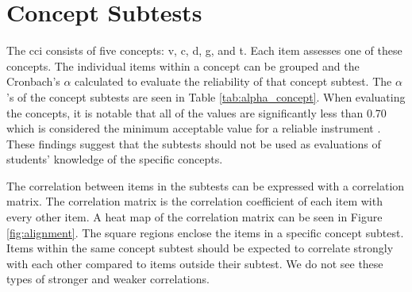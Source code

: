 \FloatBarrier
\section{Concept Subtests}
The \gls{cci} consists of five concepts: \gls{v}, \gls{c}, \gls{d}, \gls{g}, and \gls{t}. Each item assesses one of these concepts. The individual items within a concept can be grouped and the Cronbach's $\alpha$ calculated to evaluate the reliability of that concept subtest. The $\alpha$'s of the concept subtests are seen in Table \ref{tab:alpha_concept}. When evaluating the concepts, it is notable that all of the values are significantly less than 0.70 which is considered the minimum acceptable value for a reliable instrument \cite{panayiotis}. These findings suggest that the subtests should not be used as evaluations of students' knowledge of the specific concepts. 


\begin{table}[!htbp]
\caption{Cronbach's $\alpha$ by Concept}
\centering
{}
\label{tab:alpha_concept}
\end{table}


\iflong

The correlation between items in the subtests can be expressed with a correlation matrix. The correlation matrix is the correlation coefficient of each item with every other item. A heat map of the correlation matrix can be seen in Figure \ref{fig:alignment}. The square regions enclose the items in a specific concept subtest. Items within the same concept subtest should be expected to correlate strongly with each other compared to items outside their subtest. We do not see these types of stronger and weaker correlations. 

